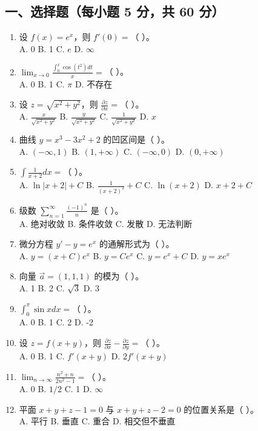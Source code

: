 \documentclass[11pt,a4paper]{article}
\begin{document}
\subsection*{一、选择题（每小题 5 分，共 60 分）}
\begin{enumerate}
    \item 设 $f(x) = e^x$，则 $f'(0) = $（ ）。 \\
    A. 0 \quad B. 1 \quad C. $e$ \quad D. $\infty$
    \item $\lim_{x \to 0} \frac{\int_0^x \cos(t^2) dt}{x} = $（ ）。 \\
    A. 0 \quad B. 1 \quad C. $\pi$ \quad D. 不存在
    \item 设 $z = \sqrt{x^2+y^2}$，则 $\frac{\partial z}{\partial x} = $（ ）。 \\
    A. $\frac{x}{\sqrt{x^2+y^2}}$ \quad B. $\frac{y}{\sqrt{x^2+y^2}}$ \quad C. $\frac{1}{\sqrt{x^2+y^2}}$ \quad D. $x$
    \item 曲线 $y = x^3 - 3x^2 + 2$ 的凹区间是（ ）。 \\
    A. $(-\infty, 1)$ \quad B. $(1, +\infty)$ \quad C. $(-\infty, 0)$ \quad D. $(0, +\infty)$
    \item $\int \frac{1}{x+2} dx = $（ ）。 \\
    A. $\ln|x+2| + C$ \quad B. $\frac{1}{(x+2)^2} + C$ \quad C. $\ln(x+2)$ \quad D. $x+2 + C$
    \item 级数 $\sum_{n=1}^{\infty} \frac{(-1)^n}{n}$ 是（ ）。 \\
    A. 绝对收敛 \quad B. 条件收敛 \quad C. 发散 \quad D. 无法判断
    \item 微分方程 $y' - y = e^x$ 的通解形式为（ ）。 \\
    A. $y = (x+C)e^x$ \quad B. $y = Ce^x$ \quad C. $y = e^x + C$ \quad D. $y = x e^x$
    \item 向量 $\vec{a} = (1, 1, 1)$ 的模为（ ）。 \\
    A. 1 \quad B. 2 \quad C. $\sqrt{3}$ \quad D. 3
    \item $\int_0^\pi \sin x dx = $（ ）。 \\
    A. 0 \quad B. 1 \quad C. 2 \quad D. -2
    \item 设 $z = f(x+y)$，则 $\frac{\partial z}{\partial x} - \frac{\partial z}{\partial y} = $（ ）。 \\
    A. 0 \quad B. 1 \quad C. $f'(x+y)$ \quad D. $2f'(x+y)$
    \item $\lim_{n \to \infty} \frac{n^2+n}{2n^2-1} = $（ ）。 \\
    A. 0 \quad B. $1/2$ \quad C. 1 \quad D. $\infty$
    \item 平面 $x+y+z-1=0$ 与 $x+y+z-2=0$ 的位置关系是（ ）。 \\
    A. 平行 \quad B. 垂直 \quad C. 重合 \quad D. 相交但不垂直
\end{enumerate}
\end{document}
